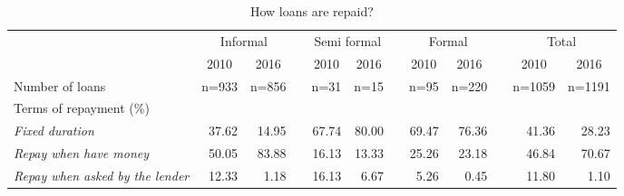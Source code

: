 \begin{table}[htbp]
  \center
  \caption{How loans are repaid?}
    \begin{tabular}{lrrrrrrrrrrr}
    \toprule
          & \multicolumn{2}{c}{Informal} &       & \multicolumn{2}{c}{Semi formal} &       & \multicolumn{2}{c}{Formal} &       & \multicolumn{2}{c}{Total} \\
\cmidrule{2-3}\cmidrule{5-6}\cmidrule{8-9}\cmidrule{11-12}          & \multicolumn{1}{c}{2010} & \multicolumn{1}{c}{2016} &       & \multicolumn{1}{c}{2010} & \multicolumn{1}{c}{2016} &       & \multicolumn{1}{c}{2010} & \multicolumn{1}{c}{2016} &       & \multicolumn{1}{c}{2010} & \multicolumn{1}{c}{2016} \\
    \midrule
    Number of loans & n=933 & n=856 &       & n=31  & n=15  &       & n=95  & n=220 &       & n=1059 & n=1191 \\
    Terms of repayment (\%) &       &       &       &       &       &       &       &       &       &       &  \\
    \hspace*{0.2cm} \textit{Fixed duration} & 37.62 & 14.95 &       & 67.74 & 80.00 &       & 69.47 & 76.36 &       & 41.36 & 28.23 \\
    \hspace*{0.2cm} \textit{Repay when have money} & 50.05 & 83.88 &       & 16.13 & 13.33 &       & 25.26 & 23.18 &       & 46.84 & 70.67 \\
    \hspace*{0.2cm} \textit{Repay when asked by the lender} & 12.33 & 1.18  &       & 16.13 & 6.67  &       & 5.26  & 0.45  &       & 11.80 & 1.10 \\
    \bottomrule
    \end{tabular}%
  \label{appendix:repay}%
\end{table}%
